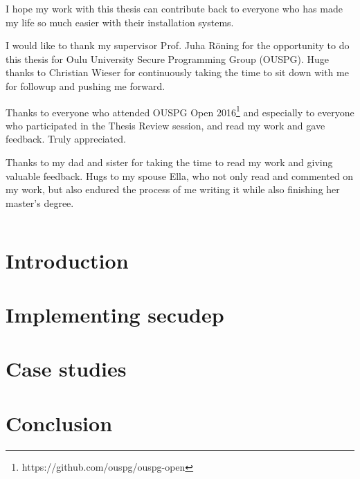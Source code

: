 \documentclass[a4paper,12pt,titlepage]{dithesis}
\begin{document}
I hope my work with this thesis can contribute back to everyone who
has made my life so much easier with their installation systems.

I would like to thank my supervisor Prof. Juha Röning for the
opportunity to do this thesis for Oulu University Secure Programming
Group (OUSPG). Huge thanks to Christian Wieser for continuously taking
the time to sit down with me for followup and pushing me forward.

Thanks to everyone who attended OUSPG Open
2016\footnote{https://github.com/ouspg/ouspg-open} and especially to
everyone who participated in the Thesis Review session, and read my
work and gave feedback. Truly appreciated.

Thanks to my dad and sister for taking the time to read my work and
giving valuable feedback. Hugs to my spouse Ella, who not only read
and commented on my work, but also endured the process of me writing
it while also finishing her master's degree.




\setlongtables
\begin{longtable}[l]{p{3cm}p{}}
  
\end{longtable}
\setcounter{table}{0}

\chapter{Introduction}
\sivunumerot{}

\chapter{Implementing secudep}

\chapter{Case studies}


\chapter{Conclusion}



\end{document}
